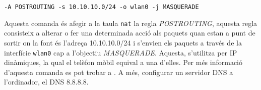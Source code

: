 \texttt{-A POSTROUTING -s 10.10.10.0/24 -o wlan0 -j MASQUERADE}


Aquesta comanda és afegir a la taula \texttt{nat} la regla \emph{POSTROUTING},
aquesta regla consisteix a alterar o fer una determinada acció als paquets quan estan a punt de sortir
on la font és l'adreça 10.10.10.0/24 i s'envien els paquets a través de
la interfície \texttt{wlan0} cap a l'objectiu \emph{MASQUERADE}.
Aquesta, s'utilitza per IP dinàmiques, la qual el telèfon mòbil equival a una d'elles.
Per més informació d'aquesta comanda es pot trobar a \autocite{man_iptables}.
A més, configurar un servidor DNS a l'ordinador, el DNS 8.8.8.8.